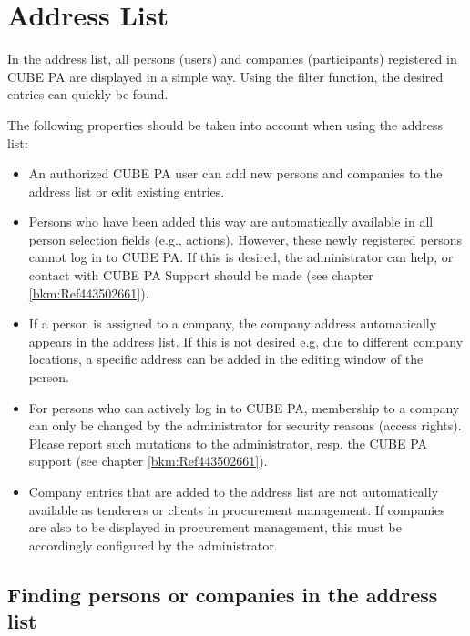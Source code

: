 
\clearpage
\section{Address List}
\label{bkm:Ref443738751}
In the address list, all persons (users) and companies (participants) registered in CUBE PA are displayed in a simple way. Using the filter function, the desired entries can quickly be found.

\vspace{\baselineskip}

The following properties should be taken into account when using the address list:

\begin{itemize}
\item
An authorized CUBE PA user can add new persons and companies to the address list or edit existing entries.

\item
Persons who have been added this way are automatically available in all person selection fields (e.g., actions). However, these newly registered persons cannot log in to CUBE PA. If this is desired, the administrator can help, or contact with CUBE PA Support should be made 
(see chapter \ref{bkm:Ref443502661}).

\item
If a person is assigned to a company, the company address automatically appears in the address list. If this is not desired e.g. due to different company locations, a specific address can be added in 
the editing window of the person.

\item
For persons who can actively log in to CUBE PA, membership to a company can only be changed by the administrator for security reasons (access rights). Please report such mutations to the administrator, resp. the CUBE PA support (see chapter \ref{bkm:Ref443502661}).

\item
Company entries that are added to the address list are not automatically available as tenderers or clients in procurement management. If companies are also to be displayed in procurement management, this must be accordingly configured by the administrator.
\end{itemize}

\pagebreak
\subsection{Finding persons or companies in the address list}

